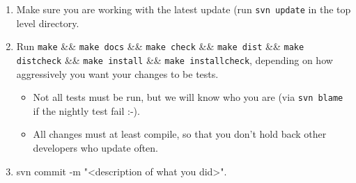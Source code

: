\begin{enumerate}
   \item Make sure you are working with the latest update (run {\tt svn update} in the top
    level directory.


   \item Run {\tt make} \&\& {\tt make docs} \&\& {\tt make check} \&\&
   {\tt make dist} \&\& 
         {\tt make distcheck} \&\& {\tt make install} \&\& {\tt make installcheck}, depending
         on how aggressively you want your changes to be tests.
   \begin{itemize}
      \item Not all tests must be run, but we will know who you are (via {\tt svn blame} 
            if the nightly test fail :-).
      \item All changes must at least compile, so that you don't hold back other
            developers who update often.
   \end{itemize}

   \item svn commit -m "<description of what you did>".

%
%
%
%
%
%

\end{enumerate}

